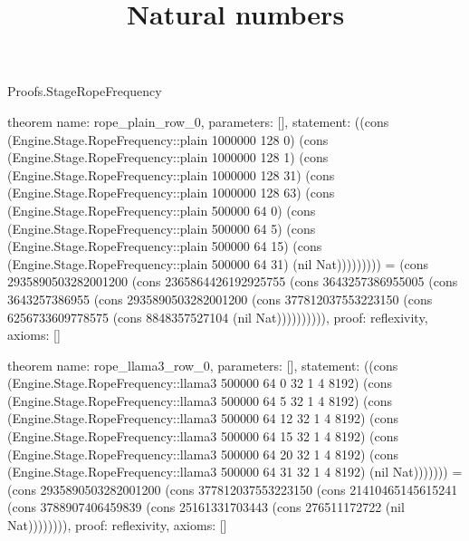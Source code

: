 \begin{lexlean}{Proofs.StageRopeFrequency}
\title{Natural numbers}
\begin{semanticmodule}
theorem{
  name: rope_plain_row_0,
  parameters: [],
  statement: ((cons (Engine.Stage.RopeFrequency::plain 1000000 128 0) (cons (Engine.Stage.RopeFrequency::plain 1000000 128 1) (cons (Engine.Stage.RopeFrequency::plain 1000000 128 31) (cons (Engine.Stage.RopeFrequency::plain 1000000 128 63) (cons (Engine.Stage.RopeFrequency::plain 500000 64 0) (cons (Engine.Stage.RopeFrequency::plain 500000 64 5) (cons (Engine.Stage.RopeFrequency::plain 500000 64 15) (cons (Engine.Stage.RopeFrequency::plain 500000 64 31) (nil Nat))))))))) = (cons 2935890503282001200 (cons 2365864426192925755 (cons 3643257386955005 (cons 3643257386955 (cons 2935890503282001200 (cons 377812037553223150 (cons 6256733609778575 (cons 8848357527104 (nil Nat)))))))))),
  proof: reflexivity{},
  axioms: []
}

theorem{
  name: rope_llama3_row_0,
  parameters: [],
  statement: ((cons (Engine.Stage.RopeFrequency::llama3 500000 64 0 32 1 4 8192) (cons (Engine.Stage.RopeFrequency::llama3 500000 64 5 32 1 4 8192) (cons (Engine.Stage.RopeFrequency::llama3 500000 64 12 32 1 4 8192) (cons (Engine.Stage.RopeFrequency::llama3 500000 64 15 32 1 4 8192) (cons (Engine.Stage.RopeFrequency::llama3 500000 64 20 32 1 4 8192) (cons (Engine.Stage.RopeFrequency::llama3 500000 64 31 32 1 4 8192) (nil Nat))))))) = (cons 2935890503282001200 (cons 377812037553223150 (cons 21410465145615241 (cons 3788907406459839 (cons 25161331703443 (cons 276511172722 (nil Nat)))))))),
  proof: reflexivity{},
  axioms: []
}
\end{semanticmodule}
\end{lexlean}
